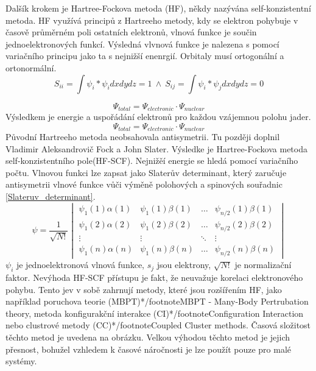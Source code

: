 \documentclass[
  digital, %
  table,   %
  lof,     %
  lot,     %
]{fithesis3}
\begin{document}
 Dalšík krokem je Hartree-Fockova metoda (HF), někdy nazývána self-konzistentní metoda. HF využívá principů z Hartreeho metody, kdy se elektron pohybuje v časově průměrném poli ostatních elektronů, vlnová funkce je součin jednoelektronových funkcí. Výsledná vlvnová funkce je nalezena s pomocí variačního principu jako ta s nejnižší enenrgií. Orbitaly musí ortogonální a ortonormální.
 \begin{equation}
 S_{ii} = \int \psi_i * \psi_i dx dy dz = 1 ~ \wedge ~ S_{ij} = \int \psi_i * \psi_j dx dy dz = 0
 \end{equation}

\begin{equation}
  \Psi_{total} = \Psi_{electronic} \cdot \Psi_{nuclear}
  \label{B_O_approximace}
\end{equation}
Výsledkem je energie a uspořádání elektronů pro každou vzájemnou polohu jader.
\begin{equation}
\Psi_{total} = \Psi_{electronic} \cdot \Psi_{nuclear}
\end{equation}
Původní Hartreeho metoda neobsahovala antisymetrii. Tu později doplnil Vladimir Aleksandrovič Fock a John Slater. Výsledke je Hartree-Fockova metoda self-konzistentního pole(HF-SCF). Nejnižěí energie se hledá pomocí variačního počtu. Vlnovou funkci lze zapsat jako Slaterův determinant, který zaručuje antisymetrii vlnové funkce vůči výměně polohových a spinových souřadnic \ref{Slateruv_determinant}.
\begin{equation}
\psi =  \frac{1}{\sqrt{N!}}\begin{vmatrix}
\psi_1(1)\alpha(1) & \psi_1(1) \beta (1)  & \dots & \psi_{n/2}(1)\beta(1) \\
\psi_1(2)\alpha(2) & \psi_1(2) \beta (2) & \dots & \psi_{n/2}(2)\beta(2) \\
\vdots             & \vdots                           & \ddots & \vdots \\
\psi_1(n)\alpha(n) & \psi_1(n) \beta (n) & \dots & \psi_{n/2}(n)\beta(n)
\end{vmatrix}
\label{Slateruv_determinant}
\end{equation}
$\psi_i$ je jednoelektronová vlnová funkce, $s_j$ jsou elektrony, $\sqrt{N!}$ je normalizační faktor.
 Nevýhoda HF-SCF přístupu je fakt, že neuvažuje korelaci elektronového pohybu. Tento jev v sobě zahrnují metody, které jsou rozšířením HF, jako například poruchova teorie (MBPT)*/footnote{MBPT - Many-Body Pertrubation theory}, metoda konfigurakční interakce (CI)*/footnote{Configuration Interaction} nebo clustrové metody (CC)*/footnote{Coupled
Cluster methods}. Časová složitost těchto metod je uvedena na obrázku. Velkou výhodou těchto metod je jejich přesnost, bohužel vzhledem k časové náročnosti je lze použít pouze pro malé systémy.
\end{document}

